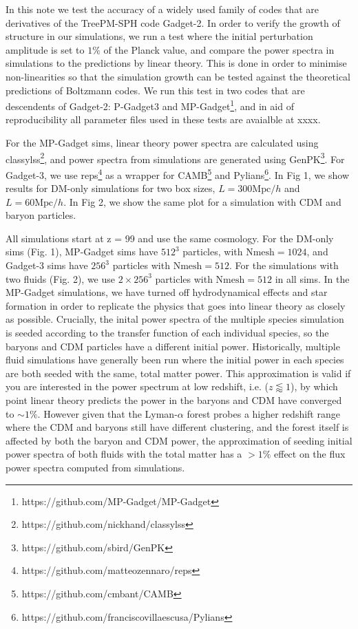 \documentclass[]{article}
\begin{document}
In this note we test the accuracy of a widely used family of codes that are derivatives of the TreePM-SPH code Gadget-2\cite{Springel2005}. In order to verify the growth of structure in our simulations, we run a test where the initial
perturbation amplitude is set to $1\%$ of the Planck value, and compare the power spectra in
simulations to the predictions by linear theory. This is done in order to minimise non-linearities
so that the simulation growth can be tested against the theoretical predictions of Boltzmann codes. We run this test
in two codes that are descendents of Gadget-2: P-Gadget3 and MP-Gadget\footnote{https://github.com/MP-Gadget/MP-Gadget}, and in aid of reproducibility all parameter files used in these tests are avaialble at xxxx.

For the MP-Gadget sims, linear theory power spectra are calculated using classylss\footnote{https://github.com/nickhand/classylss}, and
power spectra from simulations are generated using GenPK\footnote{https://github.com/sbird/GenPK}. For Gadget-3, we use reps\footnote{https://github.com/matteozennaro/reps} as a wrapper for CAMB\footnote{https://github.com/cmbant/CAMB} and
Pylians\footnote{https://github.com/franciscovillaescusa/Pylians}. In Fig 1, we show results for DM-only simulations for two box sizes, $L=300\mathrm{Mpc}/h$
and $L=60\mathrm{Mpc}/h$. In Fig 2, we show the same plot for a simulation with CDM and baryon
particles.

All simulations start at z = 99 and use the same cosmology. For the DM-only sims (Fig.
1), MP-Gadget sims have $512^3$ particles, with $\mathrm{Nmesh}=1024$, and Gadget-3 sims have $256^3$
particles with $\mathrm{Nmesh}=512$. For the simulations with two fluids (Fig. 2), we use $2\times256^3$
particles with $\mathrm{Nmesh}=512$ in all sims. In the MP-Gadget simulations, we have turned off hydrodynamical effects and star formation in order to replicate the physics that goes into linear theory as closely as possible. Crucially, the inital power spectra of the multiple species simulation is seeded according to the transfer function of each individual species, so the baryons and CDM particles have a different initial power. Historically, multiple fluid simulations have generally been run where the initial power in each species are both seeded with the same, total matter power. This approximation is valid if you are interested in the power spectrum at low redshift, i.e. ($z\lessapprox1$), by which point linear theory predicts the power in the baryons and CDM have converged to $\sim1\%$. However given that the Lyman-$\alpha$ forest probes a higher redshift range where the CDM and baryons still have different clustering, and the forest itself is affected by both the baryon and CDM power, the approximation of seeding initial power spectra of both fluids with the total matter has a $>1\%$ effect on the flux power spectra computed from simulations.
\end{document}
